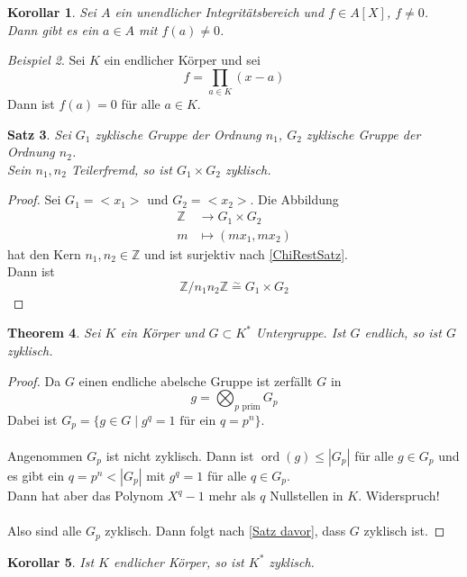 \documentclass[10pt,a4paper]{article}
\newcommand{\Z}{\ensuremath{\mathbb{Z}}}
\newcommand{\isom}{\overset{\sim}{=}}
\newcommand{\ord}{\operatorname{ord}}
\theoremstyle{plain}
\newtheorem{theorem}{Theorem}[section]
\newtheorem{kor}[theorem]{Korollar}
\newtheorem{satz}[theorem]{Satz}
\theoremstyle{definition}
\theoremstyle{remark}
\newtheorem{exm}[theorem]{Beispiel}
\begin{document}
	\begin{kor}
		Sei $A$ ein unendlicher Integritätsbereich und $f\in A[X]$, $f\neq0$. Dann gibt es ein $a\in A$ mit $f(a)\neq 0$.
	\end{kor}

	\begin{exm}
		Sei $K$ ein endlicher Körper und sei
		\[f=\prod_{a\in K}(x-a)\]
		Dann ist $f(a)=0$ für alle $a\in K$.
	\end{exm}

	\begin{satz}
		Sei $G_1$ zyklische Gruppe der Ordnung $n_1$, $G_2$ zyklische Gruppe der Ordnung $n_2$.\\
		Sein $n_1,n_2$ Teilerfremd, so ist $G_1\times G_2$ zyklisch.
	\end{satz}

	\begin{proof}
		Sei $G_1=<x_1>$ und $G_2=<x_2>$. Die Abbildung
		\begin{align*}
		\Z&\to G_1\times G_2\\
		m&\mapsto (mx_1,mx_2)
		\end{align*}
		hat den Kern $n_1,n_2\in\Z$ und ist surjektiv nach \ref{ChiRestSatz}.\\
		Dann ist
		\[\Z/n_1n_2\Z\isom G_1\times G_2\] 
	\end{proof}

	\begin{theorem}
		Sei $K$ ein Körper und $G\subset K^*$ Untergruppe. Ist $G$ endlich, so ist $G$ zyklisch.
	\end{theorem}
	\begin{proof}
		Da $G$ einen endliche abelsche Gruppe ist zerfällt $G$ in
		\[g=\bigotimes_{\text{$p$ prim}}G_p\]
		Dabei ist $G_p=\{g\in G\mid \text{$g^q=1$ für ein $q=p^n$}\}$.\\
		\\
		Angenommen $G_p$ ist nicht zyklisch. Dann ist $\ord(g)\leq |G_p|$ für alle $g\in G_p$ und es gibt ein $q=p^n<|G_p|$ mit $g^q=1$ für alle $q\in G_p$.\\
		Dann hat aber das Polynom $X^q-1$ mehr als $q$ Nullstellen in $K$. Widerspruch!\\
		\\
		Also sind alle $G_p$ zyklisch. Dann folgt nach \ref{Satz davor}, dass $G$ zyklisch ist.
	\end{proof}

	\begin{kor}
		Ist $K$ endlicher Körper, so ist $K^*$ zyklisch.
	\end{kor}
\end{document}
